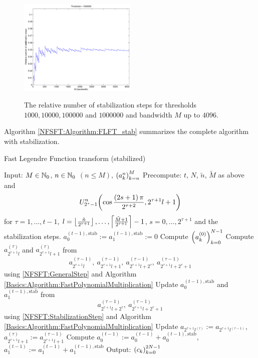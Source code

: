 \begin{figure}[htb]
   \subfigure
     {\includegraphics[width=0.5\textwidth]{images/stabilization1000000}}\\
  \caption{The relative number of stabilization steps for thresholds $1000, 10000, 100000$ and $1000000$ and bandwidth $M$ up to $4096$.}
  \label{NFSFT:figure:stabilization}
\end{figure}
Algorithm \ref{NFSFT:Algorithm:FLFT_stab} summarizes the complete algorithm with stabilization.
\begin{algorithm}[htb]
  \caption{Fast Legendre Function transform (stabilized)}
  \label{NFSFT:Algorithm:FLFT_stab}    
  \begin{algorithmic}
    \STATE Input:  $M \in \mathbb{N}_{0}$, $n \in \mathbb{N}_{0}$ $(n \le M)$, $\left(a_k^n\right)_{k=n}^{M}$
    \STATE Precompute: $t$, $N$, $\tilde{n}$, $\tilde{M}$ as above and $$U_{2^{\tau}-1}^{n}{\hspace{-0.4ex}}\left(\cos \frac{\left(2s+1\right)\pi}{2^{\tau+2}}, 2^{\tau+1}l+1\right)$$ 
    \STATE {} for $\tau = 1,\ldots,t-1$, $l = \left\lfloor\frac{\tilde{n}}{2^{\tau+1}}\right\rfloor,\ldots,\left\lceil\frac{\tilde{M}+1}{2^{\tau+1}}\right\rceil-1$, 
    \STATE {} $s = 0,\ldots,2^{\tau+1}$ and the stabilization steps.
    \STATE $a_{0}^{(t-1),\text{stab}} := a_{1}^{(t-1),\text{stab}} := 0$
    \STATE Compute $\left(a_{k}^{(0)}\right)_{k=0}^{N-1}$ 
          \STATE Compute $a_{2^{\tau+1}l}^{(\tau)}$ and $a_{2^{\tau+1}l+1}^{(\tau)}$ from $$a_{2^{\tau+1}l}^{(\tau-1)},\  
            a_{2^{\tau+1}l+1}^{(\tau-1)},\ a_{2^{\tau+1}l+2^{\tau}}^{(\tau-1)},\ a_{2^{\tau+1}l+2^{\tau}+1}^{(\tau-1)}$$ using 
            \eqref{NFSFT:GeneralStep} and Algorithm \ref{Basics:Algorithm:FastPolynomialMultiplication}
        \ELSE
          \STATE Update $a_{0}^{(t-1),\text{stab}}$ and $a_{1}^{(t-1),\text{stab}}$ from
            $$ 
              a_{2^{\tau+1}l+2^{\tau}}^{(\tau-1)},\ a_{2^{\tau+1}l+2^{\tau}+1}^{(\tau-1)}
            $$ 
            using \eqref{NFSFT:StabilizationStep} and Algorithm \ref{Basics:Algorithm:FastPolynomialMultiplication}
          \STATE Update $a_{2^{\tau+1}l^{(\tau)}} := a_{2^{\tau+1}l^{(\tau-1)}}$, $a_{2^{\tau+1}l+1}^{(\tau)} := a_{2^{\tau+1}l+1}^{(\tau-1)}$
        \ENDIF
      \ENDFOR
    \ENDFOR
    \STATE Compute $a_{0}^{(t-1)} := a_{0}^{(t-1)} + a_{0}^{(t-1),\text{stab}}$, $a_{1}^{(t-1)} := a_{1}^{(t-1)} + a_{1}^{(t-1),\text{stab}}$
    \STATE Output: $\left(c_{k}\right)_{k=0}^{2N-1}$
\end{algorithmic}
\end{algorithm}

